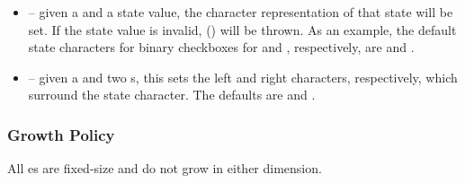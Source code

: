 \begin{itemize}
\item {} -- given a  and a state value,
  the character representation of that state will be set.  If the
  state value is invalid, 
  () will be thrown.  As an example, the
  default state characters for binary checkboxes for  and
  , respectively, are  and .
\item {} -- given a  and two
  s, this sets the left and right characters, respectively,
  which surround the state character.  The defaults are \fw{'['} and
    \fw{']'}.
\end{itemize}

\subsubsection{Growth Policy}

All es are fixed-size and do not grow in either
dimension.
